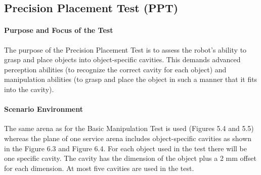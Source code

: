 \subsection{Precision Placement Test (PPT)}

\paragraph{Purpose and Focus of the Test}
The purpose of the Precision Placement Test is to assess the robot’s ability to grasp and place objects into object-specific cavities. This demands advanced perception abilities (to recognize the correct cavity for each object) and manipulation abilities (to grasp and place the object in such a manner that it fits into the cavity).

\paragraph{Scenario Environment}
The same arena as for the Basic Manipulation Test is used (Figures 5.4 and 5.5) whereas the plane of one service arena includes object-specific cavities as shown in the Figure 6.3 and Figure 6.4. For each object used in the test there will be one specific cavity. The cavity has the dimension of the object plus a 2 mm offset for each dimension. At most five cavities are used in the test.


